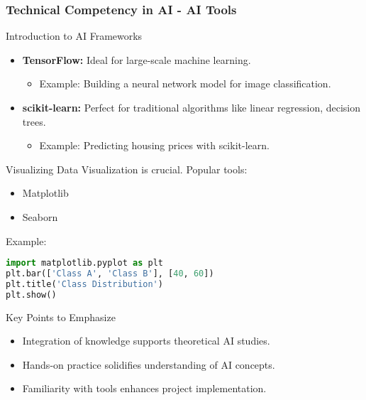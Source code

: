 \documentclass[aspectratio=169]{beamer}
\begin{document}
\begin{frame}[fragile]
    \frametitle{Technical Competency in AI - AI Tools}
    \begin{block}{Introduction to AI Frameworks}
        \begin{itemize}
            \item \textbf{TensorFlow:} Ideal for large-scale machine learning.
            \begin{itemize}
                \item Example: Building a neural network model for image classification.
            \end{itemize}
            \item \textbf{scikit-learn:} Perfect for traditional algorithms like linear regression, decision trees.
            \begin{itemize}
                \item Example: Predicting housing prices with scikit-learn.
            \end{itemize}
        \end{itemize}
    \end{block}

    \begin{block}{Visualizing Data}
        Visualization is crucial. Popular tools:
        \begin{itemize}
            \item Matplotlib
            \item Seaborn
        \end{itemize}
        Example:
        \begin{lstlisting}[language=Python]
import matplotlib.pyplot as plt
plt.bar(['Class A', 'Class B'], [40, 60])
plt.title('Class Distribution')
plt.show()
        \end{lstlisting}
    \end{block}

    \begin{block}{Key Points to Emphasize}
        \begin{itemize}
            \item Integration of knowledge supports theoretical AI studies.
            \item Hands-on practice solidifies understanding of AI concepts.
            \item Familiarity with tools enhances project implementation.
        \end{itemize}
    \end{block}
\end{frame}
\end{document}
